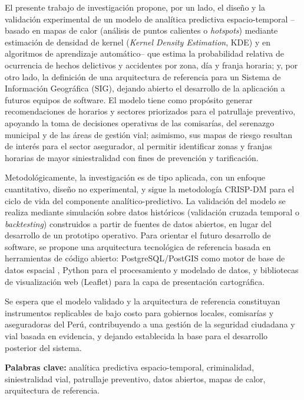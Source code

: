 \documentclass[12pt,letterpaper]{report}
\begin{document}
El presente trabajo de investigaci\'on propone, por un lado, el dise\~no y la validaci\'on experimental de un modelo de analítica predictiva espacio-temporal --basado en mapas de calor (an\'alisis de puntos calientes o \textit{hotspots}) mediante estimaci\'on de densidad de kernel (\textit{Kernel Density Estimation}, KDE) y en algoritmos de aprendizaje autom\'atico-- que estima la probabilidad relativa de ocurrencia de hechos delictivos y accidentes por zona, d\'ia y franja horaria; y, por otro lado, la definici\'on de una arquitectura de referencia para un Sistema de Informaci\'on Geogr\'afica (SIG), dejando abierto el desarrollo de la aplicaci\'on a futuros equipos de software. El modelo tiene como prop\'osito generar recomendaciones de horarios y sectores priorizados para el patrullaje preventivo, apoyando la toma de decisiones operativas de las comisar\'ias, del serenazgo municipal y de las \'areas de gesti\'on vial; asimismo, sus mapas de riesgo resultan de inter\'es para el sector asegurador, al permitir identificar zonas y franjas horarias de mayor siniestralidad con fines de prevenci\'on y tarificaci\'on.

Metodol\'ogicamente, la investigaci\'on es de tipo aplicada, con un enfoque cuantitativo, dise\~no no experimental, y sigue la metodolog\'ia CRISP-DM \citep{crispdm2000} para el ciclo de vida del componente anal\'itico-predictivo. La validaci\'on del modelo se realiza mediante simulaci\'on sobre datos hist\'oricos (validaci\'on cruzada temporal o \textit{backtesting}) construidos a partir de fuentes de datos abiertos, en lugar del desarrollo de un prototipo operativo. Para orientar el futuro desarrollo de software, se propone una arquitectura tecnol\'ogica de referencia basada en herramientas de c\'odigo abierto: PostgreSQL/PostGIS como motor de base de datos espacial \citep{postgis2024}, Python para el procesamiento y modelado de datos, y bibliotecas de visualizaci\'on web (Leaflet) para la capa de presentaci\'on cartogr\'afica.

Se espera que el modelo validado y la arquitectura de referencia constituyan instrumentos replicables de bajo costo para gobiernos locales, comisar\'ias y aseguradoras del Per\'u, contribuyendo a una gesti\'on de la seguridad ciudadana y vial basada en evidencia, y dejando establecida la base para el desarrollo posterior del sistema.

\vspace{0.5cm}
\noindent\textbf{Palabras clave:} analítica predictiva espacio-temporal, criminalidad, siniestralidad vial, patrullaje preventivo, datos abiertos, mapas de calor, arquitectura de referencia.
\end{document}

